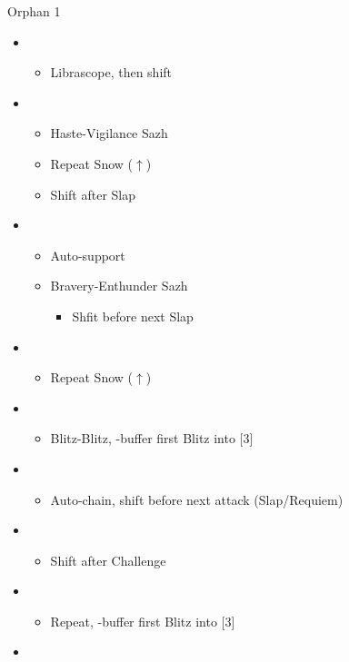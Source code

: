 \begin{battle}{Orphan 1}
	\begin{itemize}
		\item \fourth
			\begin{itemize}
				\item Librascope, then shift
			\end{itemize}
		\item \fifth
			\begin{itemize}
				\item Haste-Vigilance Sazh
				\item Repeat Snow ($\uparrow$)
				\item Shift after Slap
			\end{itemize}
		\item \sixth
			\begin{itemize}
				\item Auto-support
				\item Bravery-Enthunder Sazh
					\begin{itemize}
						\item Shfit before next Slap
					\end{itemize}
			\end{itemize}
		\item \fifth
			\begin{itemize}
				\item Repeat Snow ($\uparrow$)
			\end{itemize}
		\item \fourth
			\begin{itemize}
				\item Blitz-Blitz, \rav-buffer first Blitz into [3]
			\end{itemize}
		\item \third
			\begin{itemize}
				\item Auto-chain, shift before next attack (Slap/Requiem)
			\end{itemize}
		\item \fifth
			\begin{itemize}
				\item Shift after Challenge
			\end{itemize}
		\item \fourth
			\begin{itemize}
				\item Repeat, \rav-buffer first Blitz into [3]
			\end{itemize}
		\item \third

\end{itemize}
\end{battle}
